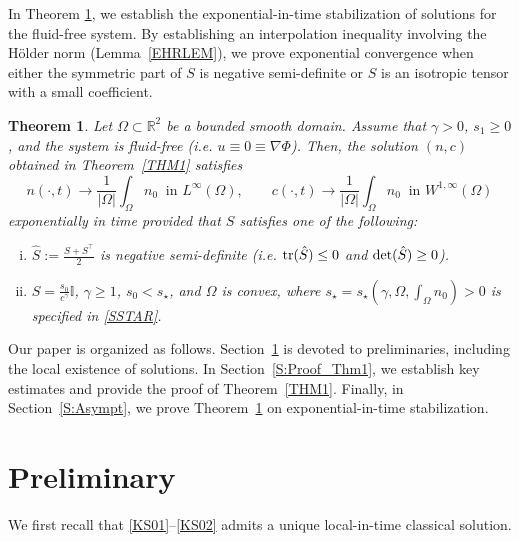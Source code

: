 \documentclass{amsart}
\newtheorem{theorem}[defn]{Theorem}
\numberwithin{equation}{section}
\newcommand{\R}{{ \mathbb{R}  }}
\begin{document}
In Theorem \ref{THM3}, we establish the exponential-in-time stabilization of solutions for the fluid-free system. By establishing an interpolation inequality involving the H\"older norm (Lemma~\ref{EHRLEM}), we prove exponential convergence when either the symmetric part of $S$ is negative semi-definite or $S$ is an isotropic tensor with a small coefficient.
\begin{theorem}\label{THM3}
Let $\Omega\subset \R^{2}$ be a bounded smooth domain. Assume that $\gamma>0$, $s_1\ge0$, and the system is fluid-free (i.e. $u\equiv 0 \equiv \nabla \Phi$).
 Then, the solution $(n,c)$ obtained in Theorem~\ref{THM1} satisfies 
\[
 n(\cdot,t)\rightarrow \frac{1}{|\Omega|}\int_{\Omega}n_{0} \ \mbox{ in }L^{\infty}(\Omega),\qquad   c(\cdot,t)\rightarrow \frac{1}{|\Omega|}\int_{\Omega}n_{0}  \ \mbox{ in } W^{1,\infty}(\Omega)
\]
exponentially in time provided that $S$ satisfies one of the following:
\begin{enumerate}[(i)]
\item $\hat{S}:=\frac{S+S^{\intercal}}{2}$ is negative semi-definite (i.e. ${\rm tr} (\hat{S})\le 0$ and ${\rm det} (\hat{S})\ge 0$).
\smallskip
\item $S=\frac{s_{0}}{c^{\gamma}} \mathbb{I}$, $\gamma\ge1$, $s_{0}< s_{\star}$, and $\Omega$ is convex, where $s_{\star}=s_{\star}(\gamma,\Omega, \int_{\Omega}n_{0})>0$ is specified in \eqref{SSTAR}.
\end{enumerate}
\end{theorem}

Our paper is organized as follows. Section~\ref{S:Prelim} is devoted to preliminaries, including the local existence of solutions. In Section~\ref{S:Proof_Thm1}, we establish key estimates and provide the proof of Theorem~\ref{THM1}. Finally, in Section~\ref{S:Asympt}, we prove Theorem~\ref{THM3} on exponential-in-time stabilization.


\section{Preliminary}\label{S:Prelim}

We first recall that \eqref{KS01}--\eqref{KS02} admits a unique local-in-time classical solution.
\end{document}
